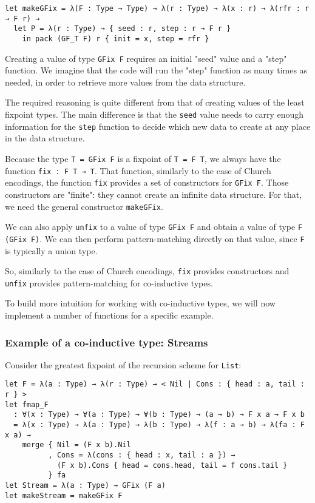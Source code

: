 \begin{lstlisting}[language=Dhall]
let makeGFix = λ(F : Type → Type) → λ(r : Type) → λ(x : r) → λ(rfr : r → F r) →
  let P = λ(r : Type) → { seed : r, step : r → F r }
    in pack (GF_T F) r { init = x, step = rfr } 
\end{lstlisting}


Creating a value of type \lstinline!GFix F! requires an initial "seed" value and a "step" function.
We imagine that the code will run the "step" function as many times as needed, in order to retrieve more values from the data structure.


The required reasoning is quite different from that of creating values of the least fixpoint types.
The main difference is that the \lstinline!seed! value needs to carry enough information for the \lstinline!step! function to decide which new data to create at any place in the data structure.


Because the type \lstinline!T = GFix F! is a fixpoint of \lstinline!T = F T!, we always have the function \lstinline!fix : F T → T!.
That function, similarly to the case of Church encodings, the function \lstinline!fix! provides a set of constructors for \lstinline!GFix F!.
Those constructors are "finite": they cannot create an infinite data structure.
For that, we need the general constructor \lstinline!makeGFix!.


We can also apply \lstinline!unfix! to a value of type \lstinline!GFix F! and obtain a value of type \lstinline!F (GFix F)!.
We can then perform pattern-matching directly on that value, since \lstinline!F! is typically a union type.


So, similarly to the case of Church encodings, \lstinline!fix! provides constructors and \lstinline!unfix! provides pattern-matching for co-inductive types.


To build more intuition for working with co-inductive types, we will now implement a number of functions for a specific example.


\subsubsection{Example of a co-inductive type: Streams}


Consider the greatest fixpoint of the recursion scheme for \lstinline!List!:


\begin{lstlisting}[language=Dhall]
let F = λ(a : Type) → λ(r : Type) → < Nil | Cons : { head : a, tail : r } >
let fmap_F
  : ∀(x : Type) → ∀(a : Type) → ∀(b : Type) → (a → b) → F x a → F x b
  = λ(x : Type) → λ(a : Type) → λ(b : Type) → λ(f : a → b) → λ(fa : F x a) →
    merge { Nil = (F x b).Nil
          , Cons = λ(cons : { head : x, tail : a }) →
            (F x b).Cons { head = cons.head, tail = f cons.tail }
          } fa
let Stream = λ(a : Type) → GFix (F a)
let makeStream = makeGFix F
\end{lstlisting}


